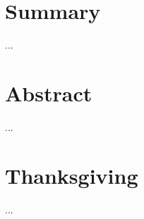 \documentclass[twoside,12pt,a4paper]{report}
\begin{document}
\section*{Summary}
...
\newpage

\section*{Abstract}
...
\newpage

\section*{Thanksgiving}
...


\newpage
\renewcommand{\baselinestretch}{1.3}
\small\normalsize

\tableofcontents

\renewcommand{\baselinestretch}{1}
\small\normalsize

\newpage
{}
\setcounter{page}{1}



\cleardoublepage

\cleardoublepage

\cleardoublepage

\cleardoublepage







\cleardoublepage

\end{document}
